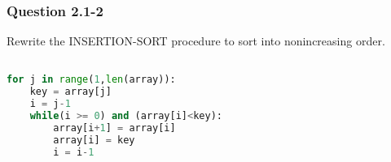 \documentclass[11pt, table]{article}
\begin{document}
\subsubsection*{Question 2.1-2}
Rewrite the INSERTION-SORT procedure to sort into nonincreasing order.
\begin{lstlisting}[language=Python]

for j in range(1,len(array)):
    key = array[j]
    i = j-1
    while(i >= 0) and (array[i]<key):
        array[i+1] = array[i]
        array[i] = key
        i = i-1
\end{lstlisting}
\end{document}
